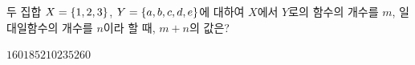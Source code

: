 두 집합 $X=\{1{,}\mkern3mu\mathopen{}2{,}\mkern3mu\mathopen{}3\}$, $Y=\{a{,}\mkern3mu\mathopen{}b{,}\mkern3mu\mathopen{}c{,}\mkern3mu\mathopen{}d{,}\mkern3mu\mathopen{}e\}$에 대하여 $X$에서 $Y$로의 함수의 개수를 $m$, 일대일함수의 개수를 $n$이라 할 때, $m+n$의 값은?
\begin{choices32}{$160$}{$185$}{$210$}{$235$}{$260$}\end{choices32}
